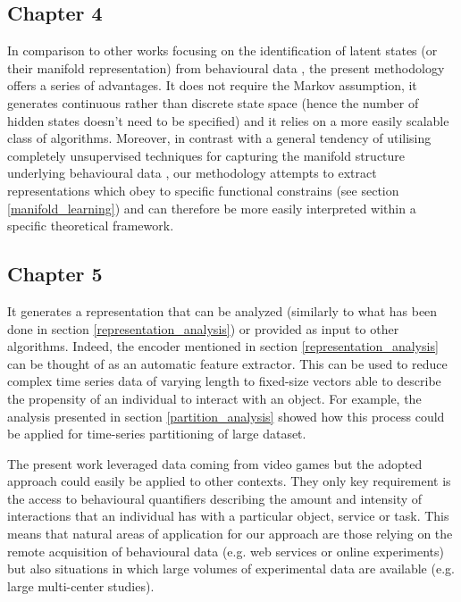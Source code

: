 \subsection{Chapter 4}
In comparison to other works focusing on the identification of latent states (or their manifold representation) from behavioural data \cite{calhoun2019unsupervised, luxem2020identifying, pereira2020quantifying, shi2021learning, mccullough2021unsupervised}, the present methodology offers a series of advantages. It does not require the Markov assumption, it generates continuous rather than discrete state space (hence the number of hidden states doesn't need to be specified) and it relies on a more easily scalable class of algorithms. Moreover, in contrast with a general tendency of utilising completely unsupervised techniques for capturing the manifold structure underlying behavioural data \cite{calhoun2019unsupervised, luxem2020identifying, pereira2020quantifying, shi2021learning, mccullough2021unsupervised}, our methodology attempts to extract representations which obey to specific functional constrains (see section \ref{manifold_learning}) and can therefore be more easily interpreted within a specific theoretical framework.

\subsection{Chapter 5}
It generates a representation that can be analyzed (similarly to what has been done in section \ref{representation_analysis}) or provided as input to other algorithms. Indeed, the encoder mentioned in section \ref{representation_analysis} can be thought of as an automatic feature extractor. This can be used to reduce complex time series data of varying length to fixed-size vectors able to describe the propensity of an individual to interact with an object. For example, the analysis presented in section \ref{partition_analysis} showed how this process could be applied for time-series partitioning of large dataset.

The present work leveraged data coming from video games but the adopted approach could easily be applied to other contexts. They only key requirement is the access to behavioural quantifiers describing the amount and intensity of interactions that an individual has with a particular object, service or task. This means that natural areas of application for our approach are those relying on the remote acquisition of behavioural data (e.g. web services or online experiments) but also situations in which large volumes of experimental data are available (e.g. large multi-center studies). 

